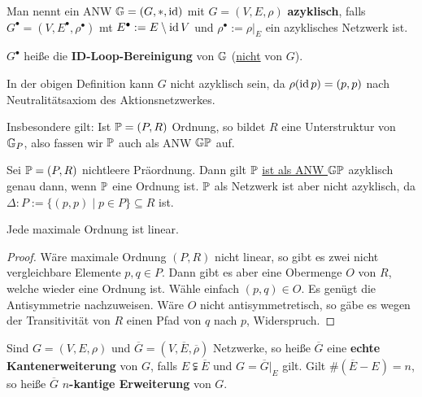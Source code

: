 \begin{definition}
    Man nennt ein ANW $\G = (G, \ast, \id)$ mit $G=(V,E,\rho)$ \textbf{azyklisch}, falls 
    $G^\bullet =(V,E^\bullet, \rho^\bullet)$ mt $E^\bullet := E \setminus \id V$ und $\rho^\bullet := \rho|_E$
    ein azyklisches Netzwerk ist.

    $G^\bullet$ heiße die \textbf{ID-Loop-Bereinigung} von $\G$ (\underline{nicht} von $G$).
\end{definition}

\begin{bemerkungnr}
    In der obigen Definition kann $G$ nicht azyklisch sein, da $\rho(\id p) = (p,p)$ nach Neutralitätsaxiom des Aktionsnetzwerkes.
\end{bemerkungnr}

\begin{bemerkungnr}
    Insbesondere gilt: Ist $\P = (P,R)$ Ordnung, so bildet $R$ eine Unterstruktur von $\G_P$, 
    also fassen wir $\P$ auch als ANW $\G\P$ auf.
\end{bemerkungnr}

\begin{beispiel}
    Sei $\P=(P,R)$ nichtleere Präordnung. Dann gilt $\P$ \underline{ist als ANW $\G\P$} azyklisch genau
    dann, wenn $\P$ eine Ordnung ist. $\P$ als Netzwerk ist aber nicht azyklisch, da 
    $\Delta:P := \{(p,p) \mid p \in P\} \subseteq R$ ist.
\end{beispiel}

\begin{satz}
    Jede maximale Ordnung ist linear.
\end{satz}
\begin{proof}
    Wäre maximale Ordnung $(P,R)$ nicht linear, so gibt es zwei nicht vergleichbare Elemente $p,q \in P$.
    Dann gibt es aber eine Obermenge $O$ von $R$, welche wieder eine Ordnung ist.
    Wähle einfach $(p,q) \in O$. 
    Es genügt die Antisymmetrie nachzuweisen.
    Wäre $O$ nicht antisymmetretisch, so gäbe es wegen der Transitivität von $R$ einen Pfad von $q$ nach $p$, Widerspruch.
\end{proof}

\begin{definition}
    Sind $G=(V,E,\rho)$ und $\overline{G} = (V, \overline{E}, \overline{\rho})$ Netzwerke, so heiße
    $\overline{G}$ eine \textbf{echte Kantenerweiterung} von $G$, falls $E \subsetneqq \overline{E}$ und $G = \overline{G}|_E$ gilt.
    Gilt $\#(\overline{E}-E) = n$, so heiße $\overline{G}$ \textbf{$n$-kantige Erweiterung} von $G$.
\end{definition}

